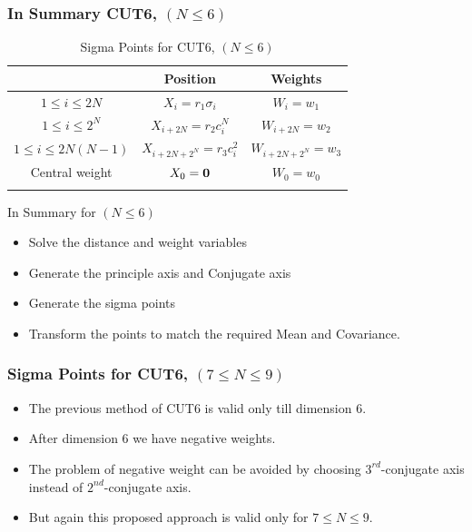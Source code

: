 \documentclass{beamer}
\begin{document}
\begin{frame}
\frametitle{In Summary CUT6, $(N\le6)$}
\begin{table}
\caption{Sigma Points for CUT6, $(N\le6)$ } 
\small
\label{sigpointscut6N6}
\begin{center}
\begin{tabular}{c|c|c}
&Position & Weights\\
\hline
\hline
$1\le i\le 2N$ & $X_i=r_1\sigma_i$ & $W_i=w_1$\\
\hline\noalign{\smallskip}
$1 \le i \le 2^N$ & $X_{i+2N}=r_2c^N_i$ & $W_{i+2N}=w_2$\\
\hline\noalign{\smallskip}
$1 \le i \le 2N(N-1)$ & $X_{i+2N+2^N}=r_3c^2_i$ & $W_{i+2N+2^N}=w_3$\\
\hline\noalign{\smallskip}
Central weight & $X_{0}={\bf 0} $ & $W_{0}=w_0$\\
\hline\noalign{\smallskip}
\multicolumn{3}{c}{$n=2N^2+2^N+1$} \\
\hline
\end{tabular}
\end{center}
\end{table} 
\begin{block}{In Summary for $(N\le6)$}
\begin{itemize}[<+->]
\item Solve the distance and weight variables
\item Generate the principle axis and Conjugate axis
\item Generate the sigma points
\item Transform the points to match the required Mean and Covariance.
\end{itemize}
\end{block}
\end{frame}
\begin{frame}
\frametitle{Sigma Points for CUT6, $(7\le N \le 9)$}
\begin{itemize}[<+->]
\item The previous method of CUT6 is valid only till dimension 6. 
\item After dimension 6 we have negative weights.
\item The problem of negative weight can be avoided by choosing  $3^{rd}$-conjugate axis instead of $2^{nd}$-conjugate axis.
\item  But again this proposed approach is valid only for $7\le N \le9$.
\end{itemize} 
\end{frame}
\end{document}

